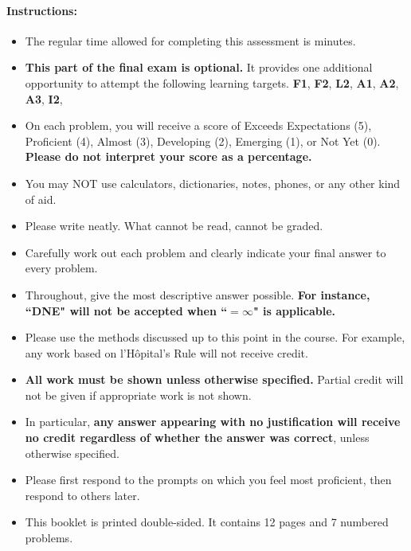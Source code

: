 \documentclass[11pt]{article}
\begin{document}
{%

\paragraph*{Instructions:}

\begin{itemize}
    
    \item The regular time allowed for completing this assessment is  minutes.
    \item \textbf{This part of the final exam is optional.} It provides one additional opportunity to attempt the following learning targets.
    {\bf\color{ProcessBlue}F1}, {\bf\color{ProcessBlue}F2}, {\bf\color{RoyalBlue}L2}, {\bf\color{RedOrange}A1}, {\bf\color{RedOrange}A2}, {\bf\color{RedOrange}A3}, {\bf\color{Fuchsia}I2}, %
    \item On each problem, you will receive a score of Exceeds Expectations (5), Proficient (4), Almost (3), Developing (2), Emerging (1), or Not Yet (0). {\bf Please do not interpret your score as a percentage.}
    \item You may NOT use calculators, dictionaries, notes, phones, or any other kind of aid.
    \item Please write neatly. What cannot be read, cannot be graded.
    \item Carefully work out each problem and clearly indicate your final answer to every problem.
    \item Throughout, give the most descriptive answer possible. \textbf{For instance, ``DNE" will not be accepted when ``$=\infty$" is applicable.}
    \item Please use the methods discussed up to this point in the course. For example, any work based on l'H\^opital's Rule will not receive credit.
    \item \textbf{All work must be shown unless otherwise specified.} Partial credit will not be given if appropriate work is not shown.
    \item In particular, {\bf any answer appearing with no justification will receive no credit regardless of whether the answer was correct}, unless otherwise specified.
    \item Please first respond to the prompts on which you feel most proficient, then respond to others later.
    \item This booklet is printed double-sided. It contains 12 pages and 7 numbered problems.
    \end{itemize}
    
    }
\end{document}
